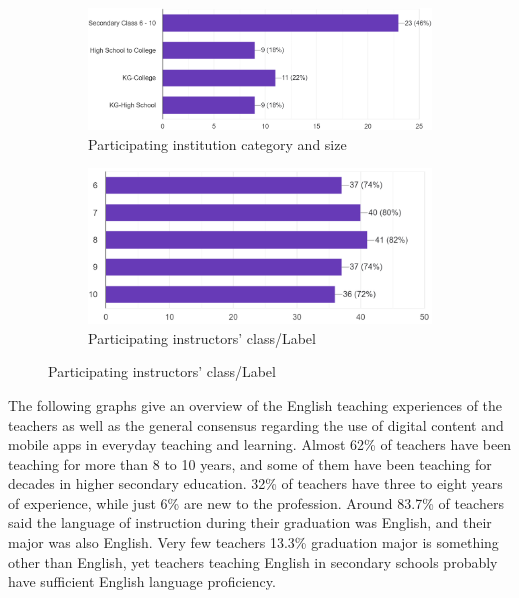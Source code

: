 \documentclass[sn-mathphys,Numbered]{sn-jnl}%
\theoremstyle{thmstyleone}%
\theoremstyle{thmstyletwo}%
\theoremstyle{thmstylethree}%
\begin{document}
\begin{figure}[h!]
\centering
\begin{subfigure}{0.48\textwidth}
    \includegraphics[width=\textwidth]{institution_size.png}
    \caption{Participating institution category and size}
    \label{cv}
\end{subfigure}
\hfill
\begin{subfigure}{0.48\textwidth}
    \includegraphics[width=\textwidth]{english_teaching_class.png}
    \caption{Participating instructors' class/Label}
    \label{umass}
\end{subfigure}       
\label{cv_umass}
\end{figure}

The following graphs give an overview of the English teaching experiences of the teachers as well as the general consensus regarding the use of digital content and mobile apps in everyday teaching and learning. Almost 62\% of teachers have been teaching for more than 8 to 10 years, and some of them have been teaching for decades in higher secondary education. 32\% of teachers have three to eight years of experience, while just 6\% are new to the profession. Around 83.7\% of teachers said the language of instruction during their graduation was English, and their major was also English. Very few teachers 13.3\% graduation major is something other than English, yet teachers teaching English in secondary schools probably have sufficient English language proficiency.
\end{document}
